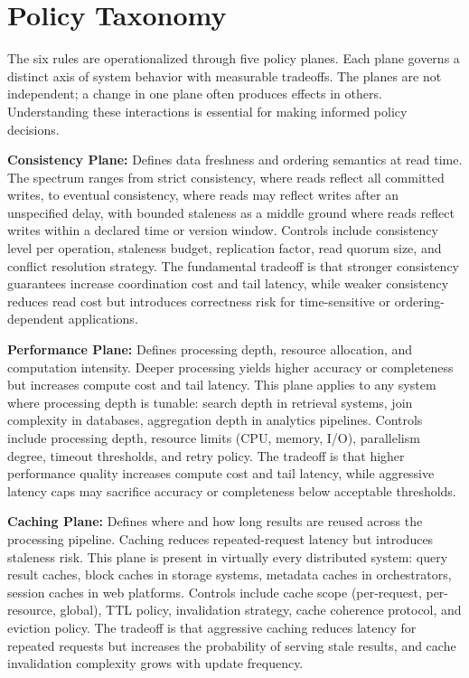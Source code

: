 \documentclass[conference]{IEEEtran}
\begin{document}
\section{Policy Taxonomy}

The six rules are operationalized through five policy planes. Each plane governs a distinct axis of system behavior with measurable tradeoffs. The planes are not independent; a change in one plane often produces effects in others. Understanding these interactions is essential for making informed policy decisions.

\textbf{Consistency Plane:} Defines data freshness and ordering semantics at read time. The spectrum ranges from strict consistency, where reads reflect all committed writes, to eventual consistency, where reads may reflect writes after an unspecified delay, with bounded staleness as a middle ground where reads reflect writes within a declared time or version window. Controls include consistency level per operation, staleness budget, replication factor, read quorum size, and conflict resolution strategy. The fundamental tradeoff is that stronger consistency guarantees increase coordination cost and tail latency, while weaker consistency reduces read cost but introduces correctness risk for time-sensitive or ordering-dependent applications.

\textbf{Performance Plane:} Defines processing depth, resource allocation, and computation intensity. Deeper processing yields higher accuracy or completeness but increases compute cost and tail latency. This plane applies to any system where processing depth is tunable: search depth in retrieval systems, join complexity in databases, aggregation depth in analytics pipelines. Controls include processing depth, resource limits (CPU, memory, I/O), parallelism degree, timeout thresholds, and retry policy. The tradeoff is that higher performance quality increases compute cost and tail latency, while aggressive latency caps may sacrifice accuracy or completeness below acceptable thresholds.

\textbf{Caching Plane:} Defines where and how long results are reused across the processing pipeline. Caching reduces repeated-request latency but introduces staleness risk. This plane is present in virtually every distributed system: query result caches, block caches in storage systems, metadata caches in orchestrators, session caches in web platforms. Controls include cache scope (per-request, per-resource, global), TTL policy, invalidation strategy, cache coherence protocol, and eviction policy. The tradeoff is that aggressive caching reduces latency for repeated requests but increases the probability of serving stale results, and cache invalidation complexity grows with update frequency.
\end{document}

